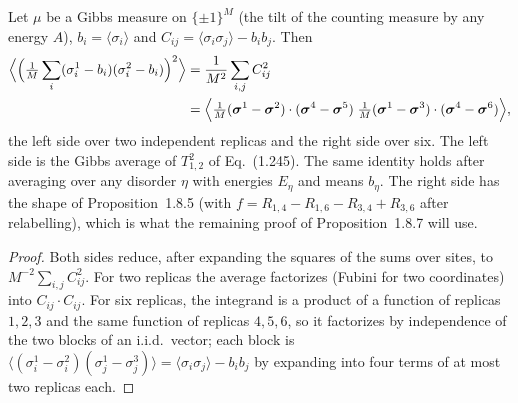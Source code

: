 \begin{theorem}
\label{thm:sg-tal:gibbs-mean-trick}
  \leanok
{}
Let $\mu$ be a Gibbs measure on $\{\pm1\}^M$ (the tilt of the counting measure by any energy $A$), $b_i=\langle\sigma_i\rangle$ and $C_{ij}=\langle\sigma_i\sigma_j\rangle-b_ib_j$.  Then
\begin{align*}
\Bigl\langle\Bigl(\tfrac1M\sum_i(\sigma^1_i-b_i)(\sigma^2_i-b_i)\Bigr)^2\Bigr\rangle
&=\frac1{M^2}\sum_{i,j}C_{ij}^2\\
&=\Bigl\langle\tfrac1M(\boldsymbol\sigma^1-\boldsymbol\sigma^2)\cdot(\boldsymbol\sigma^4-\boldsymbol\sigma^5)\;
\tfrac1M(\boldsymbol\sigma^1-\boldsymbol\sigma^3)\cdot(\boldsymbol\sigma^4-\boldsymbol\sigma^6)\Bigr\rangle,
\end{align*}
the left side over two independent replicas and the right side over six.  The left side is the Gibbs average of $T_{1,2}^2$ of Eq.~(1.245).  The same identity holds after averaging over any disorder $\eta$ with energies $E_\eta$ and means $b_\eta$.  The right side has the shape of Proposition~1.8.5 (with $f=R_{1,4}-R_{1,6}-R_{3,4}+R_{3,6}$ after relabelling), which is what the remaining proof of Proposition~1.8.7 will use.
\end{theorem}
\begin{proof}
  \leanok
Both sides reduce, after expanding the squares of the sums over sites, to $M^{-2}\sum_{i,j}C_{ij}^2$.  For two replicas the average factorizes (Fubini for two coordinates) into $C_{ij}\cdot C_{ij}$.  For six replicas, the integrand is a product of a function of replicas $1,2,3$ and the same function of replicas $4,5,6$, so it factorizes by independence of the two blocks of an i.i.d.\ vector; each block is $\langle(\sigma^1_i-\sigma^2_i)(\sigma^1_j-\sigma^3_j)\rangle=\langle\sigma_i\sigma_j\rangle-b_ib_j$ by expanding into four terms of at most two replicas each.
\end{proof}

